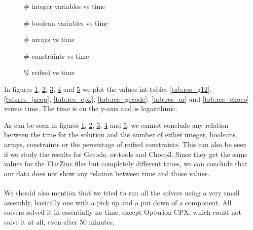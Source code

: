 \begin{figure}[H]
\centering

\caption{\# integer variables vs time}
\label{fig:int_vs_time}
\end{figure}

\begin{figure}[H]
\centering

\caption{\# boolean variables vs time}
\label{fig:bool_vs_time}
\end{figure}

\begin{figure}[H]
\centering

\caption{\# arrays vs time}
\label{fig:arr_vs_time}
\end{figure}

\begin{figure}[H]
\centering

\caption{\# constraints vs time}
\label{fig:const_vs_time}
\end{figure}

\begin{figure}[H]
\centering

\caption{\% reified vs time}
\label{fig:reif_vs_time}
\end{figure}

In figures \ref{fig:int_vs_time}, \ref{fig:bool_vs_time}, \ref{fig:arr_vs_time}, \ref{fig:const_vs_time} and \ref{fig:reif_vs_time} we plot the values int tables \ref{tab:res_g12}, \ref{tab:res_jacop}, \ref{tab:res_cpx}, \ref{tab:res_gecode}, \ref{tab:res_or} and \ref{tab:res_choco} versus time. The time is on the y-axis and is logarithmic.

As can be seen in figures \ref{fig:int_vs_time}, \ref{fig:bool_vs_time}, \ref{fig:arr_vs_time}, \ref{fig:const_vs_time} and \ref{fig:reif_vs_time}, we cannot conclude any relation between the time for the solution and the number of either integer, booleans, arrays, constraints or the percentage of reified constraints. This can also be seen if we study the results for Gecode, or-tools and Choco3. Since they get the same values for the FlatZinc files but completely different times, we can conclude that our data does not show any relation between time and those values.
\\\\
We should also mention that we tried to run all the solvers using a very small assembly, basically one with a pick up and a put down of a component. All solvers solved it in essentially no time, except Opturion CPX, which could not solve it at all, even after 50 minutes.
